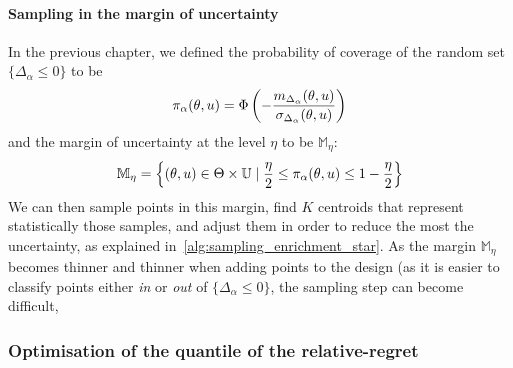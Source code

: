 \documentclass[../../Main_ManuscritThese.tex]{subfiles}
\begin{document}
\paragraph{Sampling in the margin of uncertainty}
In the previous chapter, we defined the probability of coverage of the
random set $\{\Delta_\alpha \leq 0\}$ to be
\begin{equation}
  \pi_{\alpha}(\theta, u) = \Phi\left(-\frac{m_{\Delta_{\alpha}}(\theta, u)}{\sigma_{\Delta_\alpha}(\theta, u)}\right)
  \end{equation}
  and the margin of uncertainty at the level $\eta$ to be $\mathbb{M}_{\eta}$:
  \begin{equation}
    \mathbb{M}_{\eta} = \left\{(\theta, u)\in \Theta \times \mathbb{U} \mid \frac{\eta}{2} \leq \pi_{\alpha}(\theta, u) \leq 1-\frac{\eta}{2}\right\}
  \end{equation}
  We can then sample points in this margin, find $K$ centroids that
  represent statistically those samples, and adjust them in order to
  reduce the most the uncertainty, as explained
  in~\cref{alg:sampling_enrichment_star}.  As the margin
  $\mathbb{M}_{\eta}$ becomes thinner and thinner when adding points
  to the design (as it is easier to classify points either \emph{in}
  or \emph{out} of $\{\Delta_{\alpha} \leq 0\}$, the sampling step
  can become difficult,  
\subsubsection{Optimisation of the quantile of the relative-regret}
\end{document}
